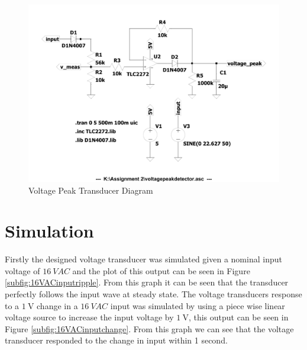 \begin{figure}[h!]
    \centering
    \includegraphics[width = 0.6\linewidth]{Figures/voltagepeakdetector.pdf}
        \caption{Voltage Peak Transducer Diagram}
    \label{fig:voltagepeakdetector.pdf}
\end{figure}


\section{Simulation} \label{sec:simulation_voltage_peak_transducer}
Firstly the designed voltage transducer was simulated given a nominal input voltage of $\SI{16}{VAC}$ and the plot of this output can be seen in Figure \ref{subfig:16VACinputripple}. From this graph it can be seen that the transducer perfectly follows the input wave at steady state. The voltage transducers response to a $\SI{1}{\volt}$ change in a $\SI{16}{VAC}$ input was simulated by using a piece wise linear voltage source to increase the input voltage by $\SI{1}{\volt}$, this output can be seen in Figure \ref{subfig:16VACinputchange}. From this graph we can see that the voltage transducer responded to the change in input within 1 second.

